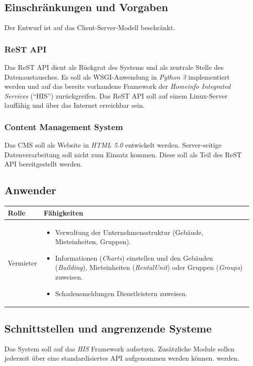 \documentclass[a4paper]{article}
\begin{document}
	\subsection{Einschränkungen und Vorgaben}
	Der Entwurf ist auf das Client-Server-Modell beschränkt.
	\subsubsection{ReST API}
	Das ReST API dient als Rückgrat des Systems und als zentrale Stelle des Datenaustausches.
	Es soll als WSGI-Anwendung in \emph{Python 3} implementiert werden und auf das bereits vorhandene Framework der \emph{Homeinfo Integrated Services} (\enquote{HIS}) zurückgreifen.
	Das ReST API soll auf einem Linux-Server lauffähig und über das Internet erreichbar sein.
	\subsubsection{Content Management System}
	Das CMS soll als Website in \emph{HTML 5.0} entwickelt werden. Server-seitige Datenverarbeitung soll nicht zum Einsatz kommen. Diese soll als Teil des ReST API bereitgestellt werden.
	
	\pagebreak
	\subsection{Anwender}
	
	\begin{tabular}{|p{}|p{}|}
	\hline
	Rolle & Fähigkeiten \\
	\hline
	Vermieter &
		\begin{itemize}
		\item Verwaltung der Unternehmensstruktur (Gebäude, Mieteinheiten, Gruppen).
		\item Informationen (\emph{Charts}) einstellen und den Gebäuden (\emph{Building}), Mieteinheiten (\emph{RentalUnit}) oder Gruppen (\emph{Groups}) zuweisen.
		\item Schadensmeldungen Dienstleistern zuweisen.
		\end{itemize} \\
	\hline
	\end{tabular}
	\subsection{Schnittstellen und angrenzende Systeme}
	Das System soll auf das \emph{HIS} Framework aufsetzen.
	Zusätzliche Module sollen jederzeit über eine standardisiertes API aufgenommen werden können. werden.
	
\end{document}
